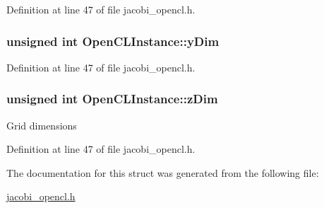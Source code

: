 Definition at line 47 of file jacobi\-\_\-opencl.\-h.

\hypertarget{struct_open_c_l_instance_a05ee9f97ea7397d010948c5f13e85529}{
\subsubsection[{y\-Dim}]{\setlength{\rightskip}{0pt plus 5cm}unsigned int Open\-C\-L\-Instance\-::y\-Dim}}\label{struct_open_c_l_instance_a05ee9f97ea7397d010948c5f13e85529}


Definition at line 47 of file jacobi\-\_\-opencl.\-h.

\hypertarget{struct_open_c_l_instance_a20e097a486b0f9b58dbd53b97f09e26c}{
\subsubsection[{z\-Dim}]{\setlength{\rightskip}{0pt plus 5cm}unsigned int Open\-C\-L\-Instance\-::z\-Dim}}\label{struct_open_c_l_instance_a20e097a486b0f9b58dbd53b97f09e26c}
Grid dimensions 

Definition at line 47 of file jacobi\-\_\-opencl.\-h.



The documentation for this struct was generated from the following file\-:\begin{DoxyCompactItemize}
\item 
\hyperlink{jacobi__opencl_8h}{jacobi\-\_\-opencl.\-h}\end{DoxyCompactItemize}
